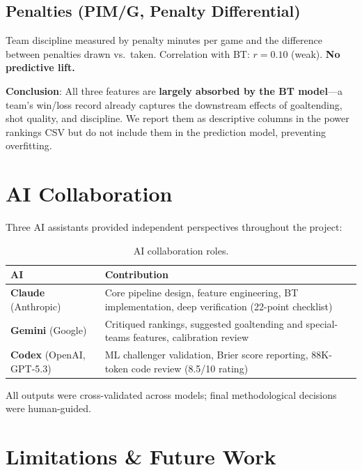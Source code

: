 \documentclass[11pt, a4paper]{article}
\begin{document}
\subsection{Penalties (PIM/G, Penalty Differential)}
Team discipline measured by penalty minutes per game and the difference between penalties drawn vs.\ taken. Correlation with BT: $r = 0.10$ (weak). \textbf{No predictive lift.}

\textbf{Conclusion}: All three features are \textbf{largely absorbed by the BT model}---a team's win/loss record already captures the downstream effects of goaltending, shot quality, and discipline. We report them as descriptive columns in the power rankings CSV but do not include them in the prediction model, preventing overfitting.

\section{AI Collaboration}
\label{sec:ai}

Three AI assistants provided independent perspectives throughout the project:

\begin{table}[H]
\centering
\caption{AI collaboration roles.}
\begin{tabular}{ll}
\toprule
\textbf{AI} & \textbf{Contribution} \\
\midrule
\textbf{Claude} (Anthropic) & Core pipeline design, feature engineering, BT implementation, deep verification (22-point checklist) \\
\textbf{Gemini} (Google) & Critiqued rankings, suggested goaltending and special-teams features, calibration review \\
\textbf{Codex} (OpenAI, GPT-5.3) & ML challenger validation, Brier score reporting, 88K-token code review (8.5/10 rating) \\
\bottomrule
\end{tabular}
\end{table}

\noindent All outputs were cross-validated across models; final methodological decisions were human-guided.

\section{Limitations \& Future Work}
\label{sec:limitations}
\end{document}
